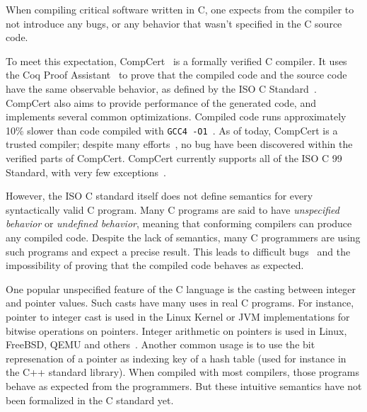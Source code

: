 When compiling critical software written in C, one expects from the compiler to not introduce any bugs, or any behavior that wasn't specified in the C source code.

To meet this expectation, CompCert~\cite{DBLP:journals/cacm/Leroy09} is a formally verified C compiler.
It uses the Coq Proof Assistant~\cite{coq} to prove that the compiled code and the source code have the same observable behavior, as defined by the ISO C Standard~\cite{iso}.
CompCert also aims to provide performance of the generated code, and implements several common optimizations. Compiled code runs approximately 10\% slower than code compiled with \texttt{GCC4 -O1}~\cite{compcertwebsite}.
As of today, CompCert is a trusted compiler; despite many efforts~\cite{DBLP:conf/pldi/YangCER11}, no bug have been discovered within the verified parts of CompCert.
CompCert currently supports all of the ISO C 99 Standard, with very few exceptions~\cite{compcertwebsite}.

However, the ISO C standard itself does not define semantics for every syntactically valid C program.
Many C programs are said to have \textit{unspecified behavior} or \textit{undefined behavior}, meaning that conforming compilers can produce any compiled code.
Despite the lack of semantics, many C programmers are using such programs and expect a precise result. %
This leads to difficult bugs~\cite{DBLP:conf/apsys/WangCCJZK12} and the impossibility of proving that the compiled code behaves as expected.

One popular unspecified feature of the C language is the casting between integer and pointer values.
Such casts have many uses in real C programs. For instance, pointer to integer cast is used in the Linux Kernel or JVM implementations for bitwise operations on pointers. Integer arithmetic on pointers is used in Linux, FreeBSD, QEMU and others~\cite{cerberus}. Another common usage is to use the bit represenation of a pointer as indexing key of a hash table (used for instance in the C++ standard library).
When compiled with most compilers, those programs behave as expected from the programmers. But these intuitive semantics have not been formalized in the C standard yet.

